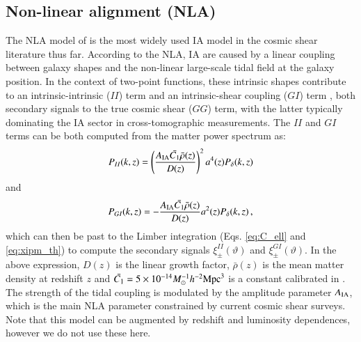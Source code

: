 \documentclass[useAMS,usenatbib]{mn2e}
\begin{document}
 
\subsection{Non-linear alignment (NLA)}

 
The NLA model of \citet{NLA} is the most widely used IA model in the cosmic shear literature thus far. According to the NLA, IA are caused by a linear coupling between galaxy shapes and the non-linear large-scale tidal field at the galaxy position. In the context of  two-point functions, these intrinsic shapes contribute to an intrinsic-intrinsic ($II$) term and an intrinsic-shear coupling ($GI$) term \citep{Hirata2004}, both secondary signals to the true cosmic shear ($GG$) term, with the latter typically dominating the IA sector in cross-tomographic measurements.  The $II$ and $GI$ terms  can be both computed from the matter power spectrum as: 
 \begin{eqnarray}
P_{II}(k,z) =  \left(\frac{A_{\rm IA}\bar{C_1}\bar{\rho}(z)}{D(z)}\right)^2a^4(z) P_{\delta}(k,z)
\label{eq:Pk_II_th}
\end{eqnarray}
and
 \begin{eqnarray}
P_{GI}(k,z) = - \frac{A_{\rm IA}\bar{C_1}\bar{\rho}(z)}{D(z)}a^2(z) P_{\delta}(k,z) \, ,
\label{eq:Pk_GI_th}
\end{eqnarray}
which can then be past to the Limber integration (Eqs. \ref{eq:C_ell} and \ref{eq:xipm_th}) to compute  the secondary signals $\xi_{\pm}^{II}(\vartheta)$ and $\xi_{\pm}^{GI}(\vartheta)$. 
In the above expression,  $D(z)$ is the linear growth factor, $\bar{\rho}(z)$ is the mean matter density at redshift $z$ and $\bar{C_1}=5\times 10^{-14} M_{\odot}^{-1} h^{-2} {\rm Mpc}^3$ is a constant calibrated in \citet{Brown2002}. 
The strength of the tidal coupling is modulated by the amplitude parameter $A_{\rm IA}$, which is the main NLA parameter constrained by current cosmic shear surveys. Note that this model can be augmented by redshift and luminosity dependences, however we do not use these here. 
\end{document}
